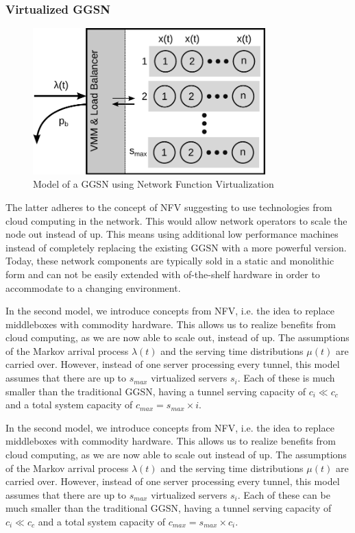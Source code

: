 \subsubsection{Virtualized \texorpdfstring{\acrshort{GGSN}}{GGSN}}
\label{c4:sec:virtual_ggsn}

\begin{figure}[htb]
	\centering
	\includegraphics[width=0.8\textwidth]{images/ggsn-virtualized.pdf}
	\caption{Model of a GGSN using Network Function Virtualization}
\label{c4:fig:model_nfv_ggsn}
\end{figure}

The latter adheres to the concept of \gls{NFV} \cite{nfv_whitepaper} suggesting to use technologies from cloud computing in the network. This would allow network operators to scale the node out instead of up. This means using additional low performance machines instead of completely replacing the existing \gls{GGSN} with a more powerful version. Today, these network components are typically sold in a static and monolithic form and can not be easily extended with of-the-shelf hardware in order to accommodate to a changing environment.


In the second model, we introduce concepts from \gls{NFV}, i.e. the idea to replace middleboxes with commodity hardware. This allows us to realize benefits from cloud computing, as we are now able to scale out, instead of up. The assumptions of the Markov arrival process $\lambda(t)$ and the serving time distributions $\mu(t)$ are carried over. However, instead of one server processing every tunnel, this model assumes that there are up to $s_{max}$ virtualized servers $s_i$. Each of these is much smaller than the traditional \gls{GGSN}, having a tunnel serving capacity of $c_i \ll c_c$ and a total system capacity of $c_{max} = s_{max} \times i$.

In the second model, we introduce concepts from \gls{NFV}, i.e. the idea to replace middleboxes with commodity hardware.
This allows us to realize benefits from cloud computing, as we are now able to scale out instead of up. The assumptions of the Markov arrival process $\lambda(t)$ and the serving time distributions $\mu(t)$ are carried over. However, instead of one server processing every tunnel, this model assumes that there are up to $s_{max}$ virtualized servers $s_i$. Each of these can be much smaller than the traditional GGSN, having a tunnel serving capacity of $c_i \ll c_c$ and a total system capacity of $c_{max} = s_{max} \times c_i$.


